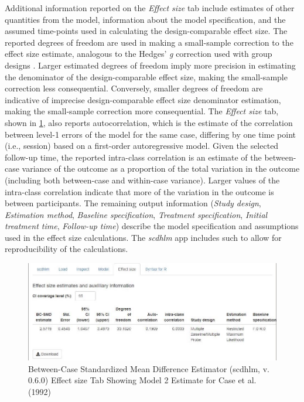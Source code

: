 \documentclass[
]{book}
\begin{document}
Additional information reported on the \emph{Effect size} tab include estimates of other quantities from the model, information about the model specification, and the assumed time-points used in calculating the design-comparable effect size. The reported degrees of freedom are used in making a small-sample correction to the effect size estimate, analogous to the Hedges' \emph{g} correction used with group designs \citep{Hedges1981distribution}. Larger estimated degrees of freedom imply more precision in estimating the denominator of the design-comparable effect size, making the small-sample correction less consequential. Conversely, smaller degrees of freedom are indicative of imprecise design-comparable effect size denominator estimation, making the small-sample correction more consequential. The \emph{Effect size} tab, shown in \ref{fig:ES-Model2-Case-1992}, also reports autocorrelation, which is the estimate of the correlation between level-1 errors of the model for the same case, differing by one time point (i.e., session) based on a first-order autoregressive model. Given the selected follow-up time, the reported intra-class correlation is an estimate of the between-case variance of the outcome as a proportion of the total variation in the outcome (including both between-case and within-case variance). Larger values of the intra-class correlation indicate that more of the variation in the outcome is between participants. The remaining output information (\emph{Study design}, \emph{Estimation method}, \emph{Baseline specification}, \emph{Treatment specification}, \emph{Initial treatment time}, \emph{Follow-up time}) describe the model specification and assumptions used in the effect size calculations. The \emph{scdhlm} app includes such to allow for reproducibility of the calculations.

\begin{figure}
\includegraphics[width=0.75\linewidth]{images/app.ES.model2_Case1992} \caption{Between-Case Standardized Mean Difference Estimator (scdhlm, v. 0.6.0) Effect size Tab Showing Model 2 Estimate for Case et al. (1992)}\label{fig:ES-Model2-Case-1992}
\end{figure}
\end{document}
